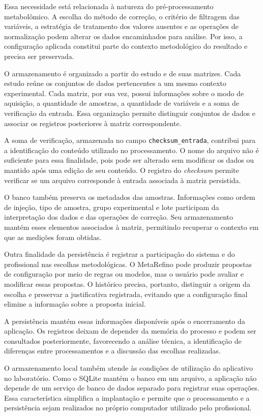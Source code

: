 Essa necessidade está relacionada à natureza do pré-processamento metabolômico. A escolha do método de correção, o critério de filtragem das variáveis, a estratégia de tratamento dos valores ausentes e as operações de normalização podem alterar os dados encaminhados para análise. Por isso, a configuração aplicada constitui parte do contexto metodológico do resultado e precisa ser preservada.

O armazenamento é organizado a partir do estudo e de suas matrizes. Cada estudo reúne os conjuntos de dados pertencentes a um mesmo contexto experimental. Cada matriz, por sua vez, possui informações sobre o modo de aquisição, a quantidade de amostras, a quantidade de variáveis e a soma de verificação da entrada. Essa organização permite distinguir conjuntos de dados e associar os registros posteriores à matriz correspondente.

A soma de verificação, armazenada no campo \texttt{checksum\_entrada}, contribui para a identificação do conteúdo utilizado no processamento. O nome do arquivo não é suficiente para essa finalidade, pois pode ser alterado sem modificar os dados ou mantido após uma edição de seu conteúdo. O registro do \textit{checksum} permite verificar se um arquivo corresponde à entrada associada à matriz persistida.

O banco também preserva os metadados das amostras. Informações como ordem de injeção, tipo de amostra, grupo experimental e lote participam da interpretação dos dados e das operações de correção. Seu armazenamento mantém esses elementos associados à matriz, permitindo recuperar o contexto em que as medições foram obtidas.

Outra finalidade da persistência é registrar a participação do sistema e do profissional nas escolhas metodológicas. O MetaRefino pode produzir propostas de configuração por meio de regras ou modelos, mas o usuário pode avaliar e modificar essas propostas. O histórico precisa, portanto, distinguir a origem da escolha e preservar a justificativa registrada, evitando que a configuração final elimine a informação sobre a proposta inicial.

A persistência mantém essas informações disponíveis após o encerramento da aplicação. Os registros deixam de depender da memória do processo e podem ser consultados posteriormente, favorecendo a análise técnica, a identificação de diferenças entre processamentos e a discussão das escolhas realizadas.

O armazenamento local também atende às condições de utilização do aplicativo no laboratório. Como o SQLite mantém o banco em um arquivo, a aplicação não depende de um serviço de banco de dados separado para registrar suas operações. Essa característica simplifica a implantação e permite que o processamento e a persistência sejam realizados no próprio computador utilizado pelo profissional.

